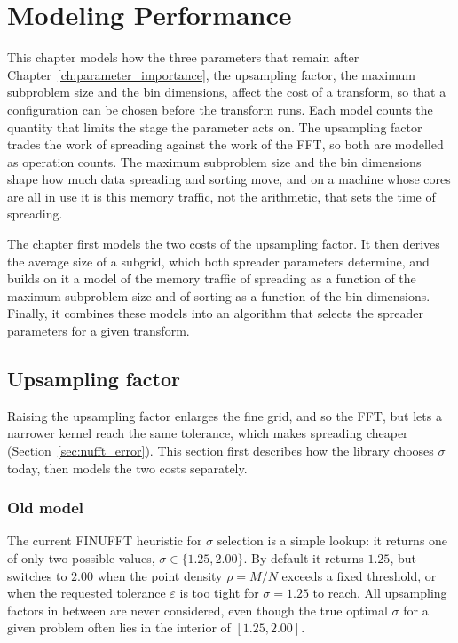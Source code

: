 \chapter{Modeling Performance}
\label{ch:sigma_selection}

This chapter models how the three parameters that remain after Chapter~\ref{ch:parameter_importance}, the upsampling factor, the maximum subproblem size and the bin dimensions, affect the cost of a transform, so that a configuration can be chosen before the transform runs. Each model counts the quantity that limits the stage the parameter acts on. The upsampling factor trades the work of spreading against the work of the FFT, so both are modelled as operation counts. The maximum subproblem size and the bin dimensions shape how much data spreading and sorting move, and on a machine whose cores are all in use it is this memory traffic, not the arithmetic, that sets the time of spreading.

The chapter first models the two costs of the upsampling factor. It then derives the average size of a subgrid, which both spreader parameters determine, and builds on it a model of the memory traffic of spreading as a function of the maximum subproblem size and of sorting as a function of the bin dimensions. Finally, it combines these models into an algorithm that selects the spreader parameters for a given transform. 

\section{Upsampling factor}

Raising the upsampling factor enlarges the fine grid, and so the FFT, but lets a narrower kernel reach the same tolerance, which makes spreading cheaper (Section~\ref{sec:nufft_error}). This section first describes how the library chooses $\sigma$ today, then models the two costs separately.
\subsection{Old model}
The current FINUFFT heuristic for $\sigma$ selection is a simple lookup: it returns one of only two possible values, $\sigma \in \{1.25, 2.00\}$. By default it returns $1.25$, but switches to $2.00$ when the point density $\rho = M/N$ exceeds a fixed threshold, or when the requested tolerance $\varepsilon$ is too tight for $\sigma = 1.25$ to reach. All upsampling factors in between are never considered, even though the true optimal $\sigma$ for a given problem often lies in the interior of $[1.25, 2.00]$.

